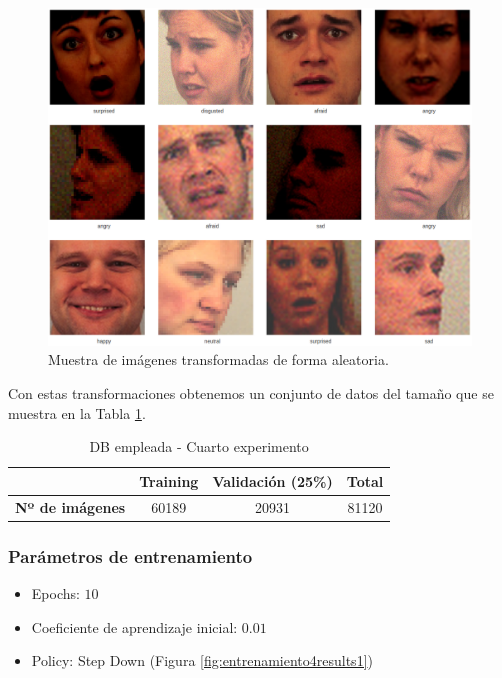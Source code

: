 \documentclass[a4paper,11pt]{book}
\begin{document}
\begin{figure}[h]
\centering
\includegraphics[width=0.9\linewidth]{imagenes/cuartoIntentoDA1}
\caption[Imágenes Aleatorias]{Muestra de imágenes transformadas de forma aleatoria.}
\label{fig:cuartoIntentoDA1}
\end{figure}

Con estas transformaciones obtenemos un conjunto de datos del tamaño que se muestra en la Tabla \ref{entr:cuartoIntento-DB}.
\begin{table}[h]
	\centering
	\begin{tabular}{c|c|c|c|}
		\cline{2-4}
		& \textbf{Training} & \textbf{Validación} (25\%) & \textbf{Total} \\ \hline
		\multicolumn{1}{|c|}{\textbf{Nº de imágenes}} & 60189       & 20931          & 81120     \\ \hline
	\end{tabular}
	\caption{DB empleada - Cuarto experimento}
	\label{entr:cuartoIntento-DB}
\end{table}


\subsubsection{Parámetros de entrenamiento}
\begin{itemize}
	\item Epochs: \(10\)
	\item Coeficiente de aprendizaje inicial: \(0.01\)
	\item Policy: Step Down (Figura \ref{fig:entrenamiento4results1})
\end{itemize}
\end{document}
